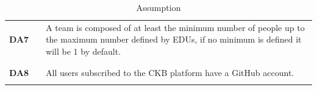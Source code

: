 \begin{table}[H]
\begin{tabular}{l l p{10.5cm}}
        \textbf{DA7} & \vline & A team is composed of at least the minimum number of people up to the maximum number defined by EDUs, if no minimum is defined it will be 1 by default.                                                                                       \\
                     &        &                                                                                                                                                                                                                                               \\\hline & & \\
        \textbf{DA8} & \vline & All users subscribed to the CKB platform have a GitHub account.                                                                                                                                                                               \\
                     &        &                                                                                                                                                                                                                                               \\
        \hline
    \end{tabular}
    \caption{Assumption}
\end{table}

